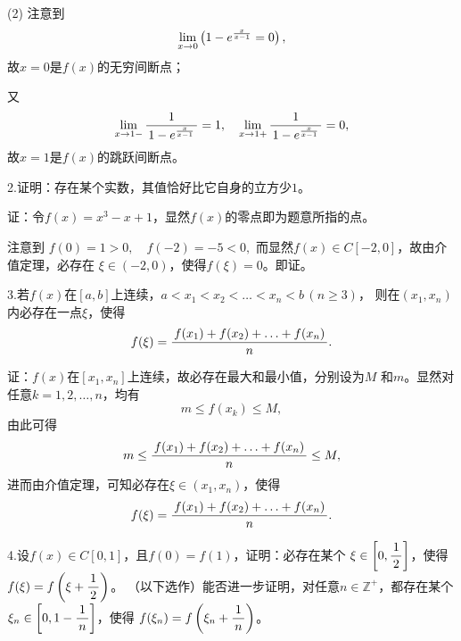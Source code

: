 (2)
注意到
$$\lim\limits_{x\to{0}}\left(1-e^{\frac{x}{x-1}}=0\right),$$
故$x=0$是$f(x)$的无穷间断点；

又
\begin{align*}
	\lim\limits_{x\to{1-}}\displaystyle\frac{\,{1}\,}{\,{1-e^{\frac{x}{x-1}}}\,}=1,
	\quad \lim\limits_{x\to{1+}}\displaystyle\frac{\,{1}\,}{\,{1-e^{\frac{x}{x-1}}}\,}=0,
\end{align*}
故$x=1$是$f(x)$的跳跃间断点。
\fin

\bs

2.证明：存在某个实数，其值恰好比它自身的立方少$1$。

证：令$f(x)=x^3-x+1$，显然$f(x)$的零点即为题意所指的点。

注意到
$f(0)=1>0,\quad f(-2)=-5<0,$
而显然$f(x)\in C[-2,0]$，故由介值定理，必存在
$\xi\in(-2,0)$，使得$f(\xi)=0$。即证。
\fin

\bs
3.若$f(x)$在$[a,b]$上连续，$a<x_1<x_2<\ldots<x_n<b\,(n\geq3)$，
则在$(x_1,x_n)$内必存在一点$\xi$，使得
$$f(\xi)=\displaystyle\frac{\,{f(x_1)+f(x_2)+\ldots+f(x_n)}\,}{\,{n}\,}.$$ 

证：$f(x)$在$[x_1,x_n]$上连续，故必存在最大和最小值，分别设为$M$
和$m$。显然对任意$k=1,2,\ldots,n$，均有
$$m\leq f(x_k)\leq M,$$
由此可得
$$m\leq \displaystyle\frac{\,{f(x_1)+f(x_2)+\ldots+f(x_n)}\,}{\,{n}\,}\leq M,$$
进而由介值定理，可知必存在$\xi\in(x_1,x_n)$，使得
$$f(\xi)=\displaystyle\frac{\,{f(x_1)+f(x_2)+\ldots+f(x_n)}\,}{\,{n}\,}.$$
\fin

\bs
4.设$f(x)\in C[0,1]$，且$f(0)=f(1)$，证明：必存在某个
$\xi\in\left[0,\displaystyle\frac{\,{1}\,}{\,{2}\,}\right]$，使得$f(\xi)=f\left(\xi+\displaystyle\frac{\,{1}\,}{\,{2}\,}\right)$。
（以下选作）能否进一步证明，对任意$n\in\mathbb{Z}^+$，都存在某个
$\xi_n\in\left[0,1-\displaystyle\frac{\,{1}\,}{\,{n}\,}\right]$，使得
$f(\xi_n)=f\left(\xi_n+\displaystyle\frac{\,{1}\,}{\,{n}\,}\right)$。

